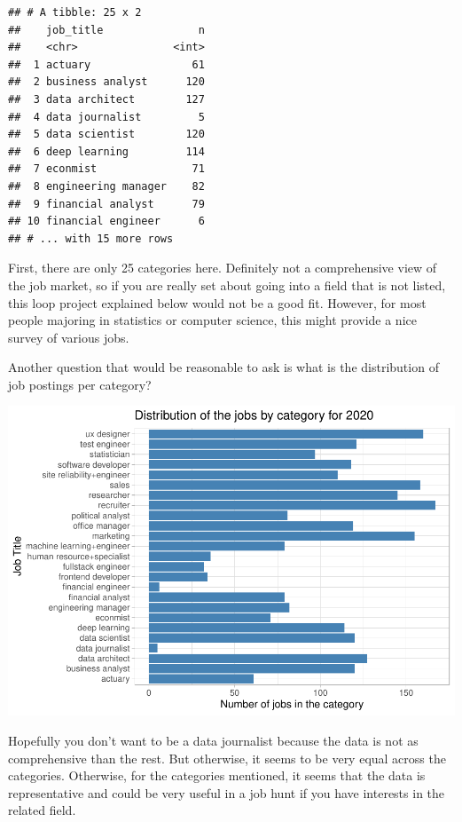 \documentclass[
]{article}
\begin{document}
\begin{verbatim}
## # A tibble: 25 x 2
##    job_title               n
##    <chr>               <int>
##  1 actuary                61
##  2 business analyst      120
##  3 data architect        127
##  4 data journalist         5
##  5 data scientist        120
##  6 deep learning         114
##  7 econmist               71
##  8 engineering manager    82
##  9 financial analyst      79
## 10 financial engineer      6
## # ... with 15 more rows
\end{verbatim}

First, there are only 25 categories here. Definitely not a comprehensive
view of the job market, so if you are really set about going into a
field that is not listed, this loop project explained below would not be
a good fit. However, for most people majoring in statistics or computer
science, this might provide a nice survey of various jobs.

Another question that would be reasonable to ask is what is the
distribution of job postings per category?

\includegraphics{main_files/figure-latex/unnamed-chunk-2-1.pdf}

Hopefully you don't want to be a data journalist because the data is not
as comprehensive than the rest. But otherwise, it seems to be very equal
across the categories. Otherwise, for the categories mentioned, it seems
that the data is representative and could be very useful in a job hunt
if you have interests in the related field.
\end{document}
